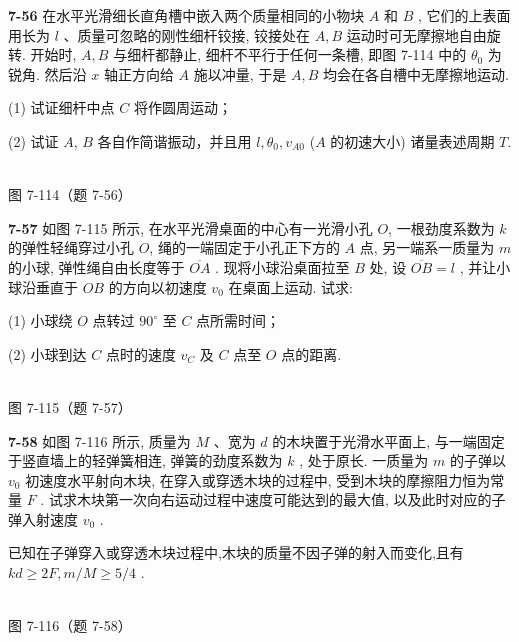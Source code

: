 \newpage

\textbf{7-56} 在水平光滑细长直角槽中嵌入两个质量相同的小物块 $A$ 和 $B$ , 它们的上表面用长为 $l$ 、质量可忽略的刚性细杆铰接, 铰接处在 $A, B$ 运动时可无摩擦地自由旋转. 开始时, $A, B$ 与细杆都静止, 细杆不平行于任何一条槽, 即图 7-114 中的 $\theta_0$ 为锐角. 然后沿 $x$ 轴正方向给 $A$ 施以冲量, 于是 $A, B$ 均会在各自槽中无摩擦地运动.

(1) 试证细杆中点 $C$ 将作圆周运动；

(2) 试证 $A$, $B$ 各自作简谐振动，并且用 $l,\theta_0,v_{A0}$ ($A$ 的初速大小) 诸量表述周期 $T$.

\begin{center}
\resizebox{0.38\textwidth}{!}{}\\[4pt]
{\small 图 7-114（题 7-56）}
\end{center}

\newpage

\textbf{7-57} 如图 7-115 所示, 在水平光滑桌面的中心有一光滑小孔 $O$, 一根劲度系数为 $k$ 的弹性轻绳穿过小孔 $O$, 绳的一端固定于小孔正下方的 $A$ 点, 另一端系一质量为 $m$ 的小球, 弹性绳自由长度等于 $\overline{OA}$ . 现将小球沿桌面拉至 $B$ 处, 设 $\overline{OB}=l$ , 并让小球沿垂直于 $OB$ 的方向以初速度 $v_{0}$ 在桌面上运动. 试求:

(1) 小球绕 $O$ 点转过 $90^{\circ}$ 至 $C$ 点所需时间；

(2) 小球到达 $C$ 点时的速度 $v_{C}$ 及 $C$ 点至 $O$ 点的距离.

\begin{center}
\resizebox{0.42\textwidth}{!}{}\\[4pt]
{\small 图 7-115（题 7-57）}
\end{center}

\newpage

\textbf{7-58} 如图 7-116 所示, 质量为 $M$ 、宽为 $d$ 的木块置于光滑水平面上, 与一端固定于竖直墙上的轻弹簧相连, 弹簧的劲度系数为 $k$ , 处于原长. 一质量为 $m$ 的子弹以 $v_0$ 初速度水平射向木块, 在穿入或穿透木块的过程中, 受到木块的摩擦阻力恒为常量 $F$ . 试求木块第一次向右运动过程中速度可能达到的最大值, 以及此时对应的子弹入射速度 $v_0$ .

已知在子弹穿入或穿透木块过程中,木块的质量不因子弹的射入而变化,且有 $kd \geqslant 2F, m/M \geqslant 5/4$ .

\begin{center}
\resizebox{0.50\textwidth}{!}{}\\[4pt]
{\small 图 7-116（题 7-58）}
\end{center}

